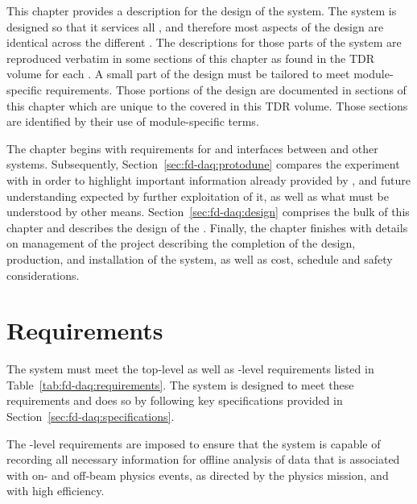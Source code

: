 This chapter provides a description for the design of the 
  system. 
The system is designed so that it services all 
, and therefore most aspects of the design are
identical across the different . 
The descriptions for those parts of the system are reproduced verbatim in some sections of this chapter as found in the TDR volume for each .
A small part of the  design must be tailored to meet module-specific requirements. 
Those portions of the design are documented in sections of this chapter which are unique to the  covered in this TDR volume. 
Those sections are identified by their use of module-specific terms.

The chapter begins with requirements for and interfaces between  and other  systems. 
Subsequently, Section~\ref{sec:fd-daq:protodune} compares the
 experiment with  in order to highlight
important information already provided by , and
future understanding expected by further exploitation of it, as well as what must be understood by other means. 
Section~\ref{sec:fd-daq:design} comprises the bulk of this chapter and
describes the design of the  . 
Finally, the chapter finishes with details on management of the
 project describing the completion of the design,
production, and installation of the system, as well as cost, schedule and
safety considerations.

\section{Requirements}
\label{sec:fd-daq:requirements}


The    system must meet the
 top-level as well as -level
requirements 
listed in Table~\ref{tab:fd-daq:requirements}. The system is
designed to meet these requirements and does so by following key
specifications provided in Section~\ref{sec:fd-daq:specifications}. 

 

The -level requirements are imposed to ensure that the
system is capable of recording all necessary information for offline 
analysis of data that is associated with on- and off-beam physics events, as directed
by the  physics mission, and with high efficiency. 

